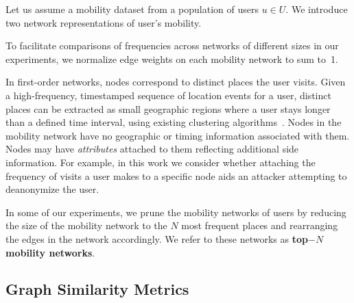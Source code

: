 Let us assume a mobility dataset from a population of users $ u \in U$.
We introduce two network representations of user's mobility.



\vspace{.4cm}
To facilitate comparisons of frequencies across networks of different sizes in our experiments, we normalize edge weights on each mobility network to sum \mbox{to 1}.

In first-order networks, nodes correspond to distinct places the user visits.
Given a high-frequency, timestamped sequence of location events for a user, distinct places can be extracted as small geographic regions where a user stays longer than a defined time interval, using existing clustering algorithms~\cite{kang2005extracting}.
Nodes in the mobility network have no geographic or timing information associated with them.
Nodes may have \emph{attributes} attached to them reflecting additional side information.
For example, in this work we consider whether attaching the frequency of visits a user makes to a specific node aids an attacker attempting to deanonymize the user.

In some of our experiments, we prune the mobility networks of users by reducing the size of the mobility network to the $ N $ most frequent places and rearranging the edges in the network accordingly.
We refer to these networks as \textbf{top$-N $ mobility networks}.

\subsection{Graph Similarity Metrics\label{sec:graph-kernels}}

